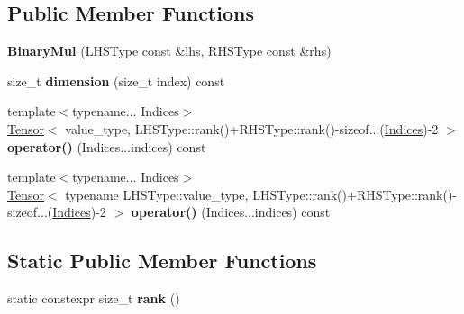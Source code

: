 \subsection*{Public Member Functions}
\begin{DoxyCompactItemize}
\item 
{\bfseries Binary\+Mul} (L\+H\+S\+Type const \&lhs, R\+H\+S\+Type const \&rhs)\hypertarget{classtensor_1_1BinaryMul_a40dc94c6aff6dbd130fa4e404479751d}{}\label{classtensor_1_1BinaryMul_a40dc94c6aff6dbd130fa4e404479751d}

\item 
size\+\_\+t {\bfseries dimension} (size\+\_\+t index) const \hypertarget{classtensor_1_1BinaryMul_a56ce8ccfa6f8bfdd22dac020e7ce395d}{}\label{classtensor_1_1BinaryMul_a56ce8ccfa6f8bfdd22dac020e7ce395d}

\item 
{\footnotesize template$<$typename... Indices$>$ }\\\hyperlink{classtensor_1_1Tensor}{Tensor}$<$ value\+\_\+type, L\+H\+S\+Type\+::rank()+R\+H\+S\+Type\+::rank()-\/sizeof...(\hyperlink{classtensor_1_1Indices}{Indices})-\/2 $>$ {\bfseries operator()} (Indices...\+indices) const \hypertarget{classtensor_1_1BinaryMul_acf3d57f34d826810dd346647107f2097}{}\label{classtensor_1_1BinaryMul_acf3d57f34d826810dd346647107f2097}

\item 
{\footnotesize template$<$typename... Indices$>$ }\\\hyperlink{classtensor_1_1Tensor}{Tensor}$<$ typename L\+H\+S\+Type\+::value\+\_\+type, L\+H\+S\+Type\+::rank()+R\+H\+S\+Type\+::rank()-\/sizeof...(\hyperlink{classtensor_1_1Indices}{Indices})-\/2 $>$ {\bfseries operator()} (Indices...\+indices) const \hypertarget{classtensor_1_1BinaryMul_abb82ed8b97fc551cd9c40dc0069cb359}{}\label{classtensor_1_1BinaryMul_abb82ed8b97fc551cd9c40dc0069cb359}

\end{DoxyCompactItemize}
\subsection*{Static Public Member Functions}
\begin{DoxyCompactItemize}
\item 
static constexpr size\+\_\+t {\bfseries rank} ()\hypertarget{classtensor_1_1BinaryMul_aab0b3fde23cd87bdadbc74ba8615c8dd}{}\label{classtensor_1_1BinaryMul_aab0b3fde23cd87bdadbc74ba8615c8dd}

\end{DoxyCompactItemize}


